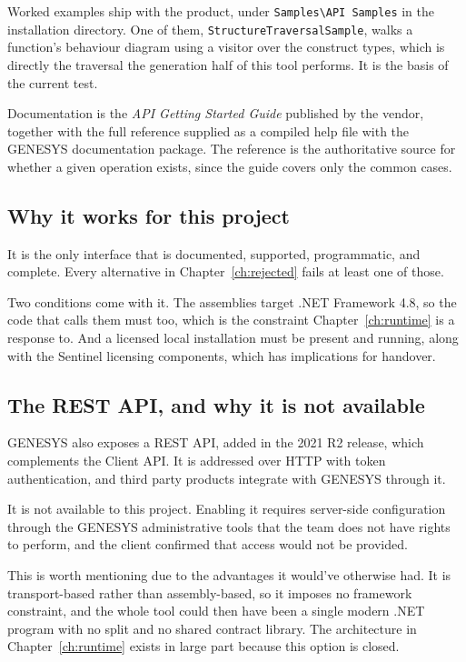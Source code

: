 Worked examples ship with the product, under \texttt{Samples\textbackslash API
Samples} in the installation directory. One of them,
\texttt{StructureTraversalSample}, walks a function's behaviour diagram using a
visitor over the construct types, which is directly the traversal the generation
half of this tool performs. It is the basis of the current
 test.

Documentation is the \emph{API Getting Started Guide} published by the vendor,
together with the full reference supplied as a compiled help file with the
GENESYS documentation package. The reference is the authoritative source for
whether a given operation exists, since the guide covers only the common
cases.

\subsection{Why it works for this project}

It is the only interface that is documented, supported, programmatic, and
complete. Every alternative in Chapter~\ref{ch:rejected} fails at least one of
those.

Two conditions come with it. The assemblies target .NET Framework 4.8, so the
code that calls them must too, which is the constraint Chapter~\ref{ch:runtime}
is a response to. And a licensed local installation must be present and running,
along with the Sentinel licensing components, which has implications for
handover.

\subsection{The REST API, and why it is not available}

GENESYS also exposes a REST API, added in the 2021 R2 release, which complements
the Client API. It is addressed over HTTP with token authentication, and third
party products integrate with GENESYS through it.

It is not available to this project. Enabling it requires server-side
configuration through the GENESYS administrative tools that the team does not
have rights to perform, and the client confirmed that access would not be
provided. 

This is worth mentioning due to the advantages it would've otherwise had.
It is transport-based rather than assembly-based, so it imposes no framework
constraint, and the whole tool could then have been a single modern .NET program
with no split and no shared contract library. The architecture in
Chapter~\ref{ch:runtime} exists in large part because this option is closed.

